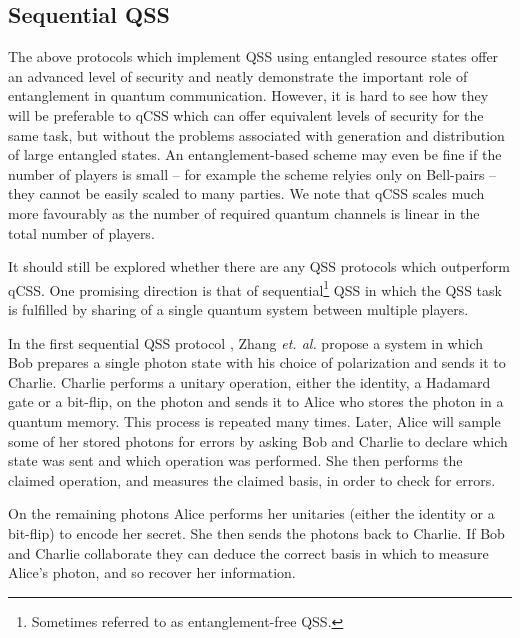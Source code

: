 


\subsection{Sequential QSS}
The above protocols which implement QSS using entangled resource states offer an advanced level of security and neatly demonstrate the important role of entanglement in quantum communication. However, it is hard to see how they will be preferable to qCSS which can offer equivalent levels of security for the same task, but without the problems associated with generation and distribution of large entangled states. An entanglement-based scheme may even be fine if the number of players is small -- for example the scheme \cite{Karlsson1999} relyies only on Bell-pairs -- they cannot be easily scaled to many parties. We note that qCSS scales much more favourably as the number of required quantum channels is linear in the total number of players.

It should still be explored whether there are any QSS protocols which outperform qCSS. One promising direction is that of sequential\footnote{Sometimes referred to as entanglement-free QSS.} QSS in which the QSS task is fulfilled by sharing of a single quantum system between multiple players.

In the first sequential QSS protocol \cite{Zhang2005}, Zhang \emph{et. al.} propose a system in which Bob prepares a single photon state with his choice of polarization and sends it to Charlie. Charlie performs a unitary operation, either the identity, a Hadamard gate or a bit-flip, on the photon and sends it to Alice who stores the photon in a quantum memory. This process is repeated many times. Later, Alice will sample some of her stored photons for errors by asking Bob and Charlie to declare which state was sent and which operation was performed. She then performs the claimed operation, and measures the claimed basis, in order to check for errors.

On the remaining photons Alice performs her unitaries (either the identity or a bit-flip) to encode her secret. She then sends the photons back to Charlie. %
If Bob and Charlie collaborate they can deduce the correct basis in which to measure Alice's photon, and so recover her information.



